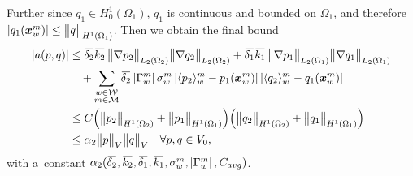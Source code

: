 Further since $q_1\in H^1_0(\Omega_1)$, $q_1$ is continuous and bounded on $\Omega_1$, and therefore $\left|q_1(\mathbf{\boldsymbol{x}}^m_w)\right|\leq \bigl\Vert q\bigr\Vert_{H^1(\Omega_1)}$.
Then we obtain the final bound
\begin{align} \label{eqn:prim_form_a_bound}
    \abs{a(p,q)} &\leq \overbar{\delta_2}\overbar{k_2}\, \norm{\grad p_2}_{L_2(\Omega_2)} \norm{\grad q_2}_{L_2(\Omega_2)}
        + \overbar{\delta_1}\overbar{k_1}\, \norm{\grad p_1}_{L_2(\Omega_1)} \norm{\grad q_1}_{L_2(\Omega_1)} \nonumber\\
        &\quad + \sum_{\substack{w\in \mathcal{W} \\ m\in \mathcal{M}}} \overbar{\delta_2} \abs{\Gamma^m_w} \sigma^m_w
            \abs{\avg{p_2}^m_w - p_1(\vc x^m_w)}\abs{\avg{q_2}^m_w - q_1(\vc x^m_w)} \nonumber\\
    &\leq C \Big( \norm{p_2}_{H^1(\Omega_2)} + \norm{p_1}_{H^1(\Omega_1)} \Big) \Big( \norm{q_2}_{H^1(\Omega_2)} + \norm{q_1}_{H^1(\Omega_1)} \Big) \nonumber\\
    &\leq \alpha_2 \norm{p}_V \norm{q}_V \quad \forall p,q\in V_0,
\end{align}
with a~constant $\alpha_2(\overbar{\delta_2},\overbar{k_2},\overbar{\delta_1},\overbar{k_1},\sigma^m_w,\abs{\Gamma^m_w},C_{avg})$.

